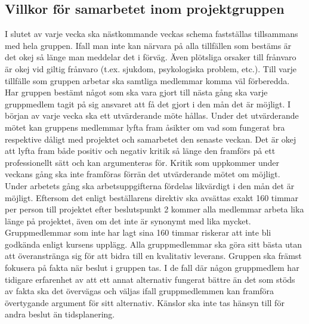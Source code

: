 \documentclass{article}
\begin{document}
\subsection{Villkor för samarbetet inom projektgruppen}
\label{subsec:villkorsamarbete}

I slutet av varje vecka ska nästkommande veckas schema fastställas tillsammans med hela gruppen. Ifall man inte kan närvara på alla tillfällen som bestäms är det okej så länge man meddelar det i förväg. Även plötsliga orsaker till frånvaro är okej vid giltig frånvaro (t.ex. sjukdom, psykologiska problem, etc.).
\newline\newline
Till varje tillfälle som gruppen arbetar ska samtliga medlemmar komma väl förberedda. Har gruppen bestämt något som ska vara gjort till nästa gång ska varje gruppmedlem tagit på sig ansvaret att få det gjort i den mån det är möjligt.
\newline\newline
I början av varje vecka ska ett utvärderande möte hållas. Under det utvärderande mötet kan gruppens medlemmar lyfta fram åsikter om vad som fungerat bra respektive dåligt med projektet och samarbetet den senaste veckan. Det är okej att lyfta fram både positiv och negativ kritik så länge den framförs på ett professionellt sätt och kan argumenteras för. Kritik som uppkommer under veckans gång ska inte framföras förrän det utvärderande mötet om möjligt.
\newline\newline
Under arbetets gång ska arbetsuppgifterna fördelas likvärdigt i den mån det är möjligt. Eftersom det enligt beställarens direktiv ska avsättas exakt 160 timmar per person till projektet efter beslutspunkt 2 kommer alla medlemmar arbeta lika länge på projektet, även om det inte är synonymt med lika mycket. Gruppmedlemmar som inte har lagt sina 160 timmar riskerar att inte bli godkända enligt kursens upplägg.
\newline\newline
Alla gruppmedlemmar ska göra sitt bästa utan att överanstränga sig för att bidra till en kvalitativ leverans.
\newline\newline
Gruppen ska främst fokusera på fakta när beslut i gruppen tas. I de fall där någon gruppmedlem har tidigare erfarenhet av att ett annat alternativ fungerat bättre än det som stöds av fakta ska det övervägas och väljas ifall gruppmedlemmen kan framföra övertygande argument för sitt alternativ. Känslor ska inte tas hänsyn till för andra beslut än tidsplanering.
\end{document}
